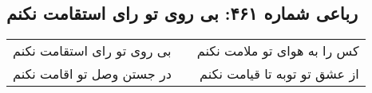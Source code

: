 \begin{center}
\section*{رباعی شماره ۴۶۱: بی روی تو رای استقامت نکنم}
\label{sec:sh461}
\begin{longtable}{l p{0.5cm} r}
بی روی تو رای استقامت نکنم
&&
کس را به هوای تو ملامت نکنم
\\
در جستن وصل تو اقامت نکنم
&&
از عشق تو توبه تا قیامت نکنم
\\
\end{longtable}
\end{center}
